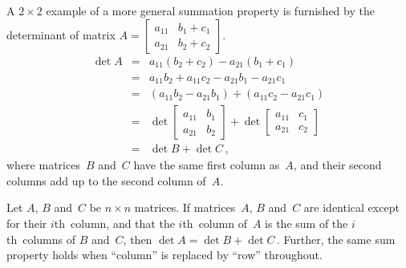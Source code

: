 \begin{example} \label{eg:cpdet2}
A \(2\times2\) example of a more general summation property is furnished by the determinant of matrix \(A=\begin{bmatrix} a_{11}&b_1+c_1\\a_{21}&b_2+c_2 \end{bmatrix}\).
\begin{eqnarray*}
\det A&=&a_{11}(b_2+c_2)-a_{21}(b_1+c_1)
\\&=&a_{11}b_2+a_{11}c_2-a_{21}b_1-a_{21}c_1
\\&=&(a_{11}b_2-a_{21}b_1)+(a_{11}c_2-a_{21}c_1)
\\&=&\det\begin{bmatrix} a_{11}&b_1\\a_{21}&b_2 \end{bmatrix}
+\det\begin{bmatrix} a_{11}&c_1\\a_{21}&c_2 \end{bmatrix}
\\&=&\det B+\det C\,,
\end{eqnarray*}
where matrices~\(B\) and~\(C\) have the same first column as~\(A\), and their second columns add up to the second column of~\(A\).
\end{example}





\begin{theorem} \label{thm:rpdet:v} 
Let \(A\), \(B\) and~\(C\) be \(n\times n\) matrices.
If matrices~\(A\), \(B\) and~\(C\) are identical except for their \(i\)th~column, and that the \(i\)th~column of~\(A\) is the sum of the \(i\)th~columns of \(B\) and~\(C\), then \(\det A=\det B+\det C\)\,.
Further, the same sum property holds when ``column'' is replaced by ``row'' throughout.
\end{theorem}


